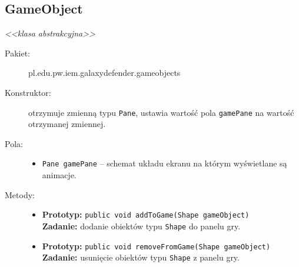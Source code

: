 \documentclass[a4paper]{article}
\newcommand{\prog}{\texttt}
\begin{document}
\subsection{GameObject}
\textit{<<klasa abstrakcyjna>>}
\begin{description}
    \item[Pakiet:] pl.edu.pw.iem.galaxydefender.gameobjects
    \item[Konstruktor:] otrzymuje zmienną typu \prog{Pane}, ustawia wartość pola \prog{gamePane} na wartość otrzymanej zmiennej.
    \item[Pola:] \hfill
    \begin{itemize}
        \item \prog{Pane gamePane} -- schemat układu ekranu na którym wyświetlane są animacje.
    \end{itemize} 
    \item[Metody:] \hfill
    \begin{itemize}
        \item \textbf{Prototyp:} \prog{public void addToGame(Shape gameObject)}\\\textbf{Zadanie:} dodanie obiektów typu \prog{Shape} do panelu gry.
        \item \textbf{Prototyp:} \prog{public void removeFromGame(Shape gameObject)}\\\textbf{Zadanie:} usunięcie obiektów typu \prog{Shape} z panelu gry.
    \end{itemize}
\end{description}
\end{document}
